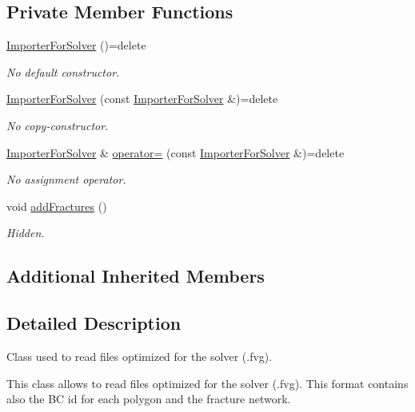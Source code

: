 \subsection*{Private Member Functions}
\begin{DoxyCompactItemize}
\item 
\hyperlink{classFVCode3D_1_1ImporterForSolver_ad6c301e75fb02c27edfb011f611225b5}{Importer\+For\+Solver} ()=delete
\begin{DoxyCompactList}\small\item\em No default constructor. \end{DoxyCompactList}\item 
\hyperlink{classFVCode3D_1_1ImporterForSolver_a3c93375f054f2a9b2a4597ac79e28fed}{Importer\+For\+Solver} (const \hyperlink{classFVCode3D_1_1ImporterForSolver}{Importer\+For\+Solver} \&)=delete
\begin{DoxyCompactList}\small\item\em No copy-\/constructor. \end{DoxyCompactList}\item 
\hyperlink{classFVCode3D_1_1ImporterForSolver}{Importer\+For\+Solver} \& \hyperlink{classFVCode3D_1_1ImporterForSolver_a80f0e0a4c9facf443da6bec27bbc2642}{operator=} (const \hyperlink{classFVCode3D_1_1ImporterForSolver}{Importer\+For\+Solver} \&)=delete
\begin{DoxyCompactList}\small\item\em No assignment operator. \end{DoxyCompactList}\item 
void \hyperlink{classFVCode3D_1_1ImporterForSolver_aafb9ee01c07359f0cb1421729ca2fa86}{add\+Fractures} ()
\begin{DoxyCompactList}\small\item\em Hidden. \end{DoxyCompactList}\end{DoxyCompactItemize}
\subsection*{Additional Inherited Members}


\subsection{Detailed Description}
Class used to read files optimized for the solver (.fvg). 

This class allows to read files optimized for the solver (.fvg). This format contains also the BC id for each polygon and the fracture network. 

